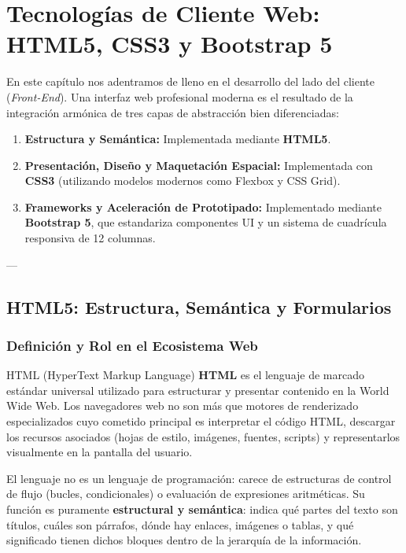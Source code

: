 \chapter{Tecnologías de Cliente Web: HTML5, CSS3 y Bootstrap 5}
\label{cap:tema2}

En este capítulo nos adentramos de lleno en el desarrollo del lado del cliente (\textit{Front-End}). Una interfaz web profesional moderna es el resultado de la integración armónica de tres capas de abstracción bien diferenciadas:
\begin{enumerate}
  \item \textbf{Estructura y Semántica:} Implementada mediante \textbf{HTML5}.
  \item \textbf{Presentación, Diseño y Maquetación Espacial:} Implementada con \textbf{CSS3} (utilizando modelos modernos como Flexbox y CSS Grid).
  \item \textbf{Frameworks y Aceleración de Prototipado:} Implementado mediante \textbf{Bootstrap 5}, que estandariza componentes UI y un sistema de cuadrícula responsiva de 12 columnas.
\end{enumerate}

---

\section{HTML5: Estructura, Semántica y Formularios}

\subsection{Definición y Rol en el Ecosistema Web}

\begin{definicion}{HTML (HyperText Markup Language)}
\textbf{HTML} es el lenguaje de marcado estándar universal utilizado para estructurar y presentar contenido en la World Wide Web. Los navegadores web no son más que motores de renderizado especializados cuyo cometido principal es interpretar el código HTML, descargar los recursos asociados (hojas de estilo, imágenes, fuentes, scripts) y representarlos visualmente en la pantalla del usuario.
\end{definicion}

El lenguaje no es un lenguaje de programación: carece de estructuras de control de flujo (bucles, condicionales) o evaluación de expresiones aritméticas. Su función es puramente \textbf{estructural y semántica}: indica qué partes del texto son títulos, cuáles son párrafos, dónde hay enlaces, imágenes o tablas, y qué significado tienen dichos bloques dentro de la jerarquía de la información.


